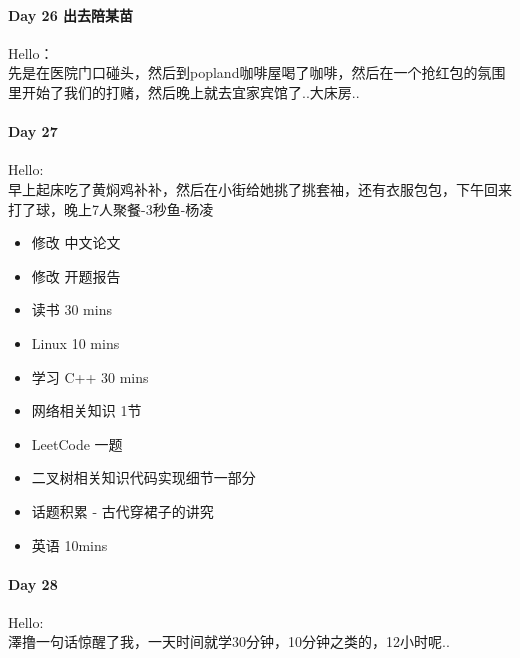 \documentclass[UTF8,a4paper,8pt]{ctexbook}
\begin{document}
 	 \paragraph{Day 26   出去陪某苗   \quad     }Hello：\\
	 	 先是在医院门口碰头，然后到popland咖啡屋喝了咖啡，然后在一个抢红包的氛围里开始了我们的打赌，然后晚上就去宜家宾馆了..大床房..
 	 \paragraph{Day 27      \quad     }Hello:\\
	 	 早上起床吃了黄焖鸡补补，然后在小街给她挑了挑套袖，还有衣服包包，下午回来打了球，晚上7人聚餐-3秒鱼-杨凌
	 	 \begin{itemize}
	 	 	\item \makebox[0pt][l]{$\square$}\raisebox{.15ex}{\hspace{0.1em}$\checkmark$}修改  中文论文
	 	 	\item \makebox[0pt][l]{$\square$}\raisebox{.15ex}{\hspace{0.1em}$\checkmark$}修改  开题报告
	 	 	\item \makebox[0pt][l]{$\square$}\raisebox{.15ex}{\hspace{0.1em}$\checkmark$}读书       30 mins	
	 	 	\item \makebox[0pt][l]{$\square$}\raisebox{.15ex}{\hspace{0.1em}$\checkmark$}Linux      10 mins	  
	 	 	\item 学习  C++  30 mins 
	 	 	
	 	 	\item  网络相关知识 1节
	 	 	\item  LeetCode    一题
	 	 	\item  二叉树相关知识代码实现细节一部分 
	 	 	
	 	 	\item  \makebox[0pt][l]{$\square$}\raisebox{.15ex}{\hspace{0.1em}$\checkmark$}话题积累 	- 古代穿裙子的讲究
	 	 	\item  英语 10mins
	 	 \end{itemize}
 	 \paragraph{Day 28      \quad     }
	 	 Hello:\\
	 	 澤撸一句话惊醒了我，一天时间就学30分钟，10分钟之类的，12小时呢..
	 	 
\end{document}
